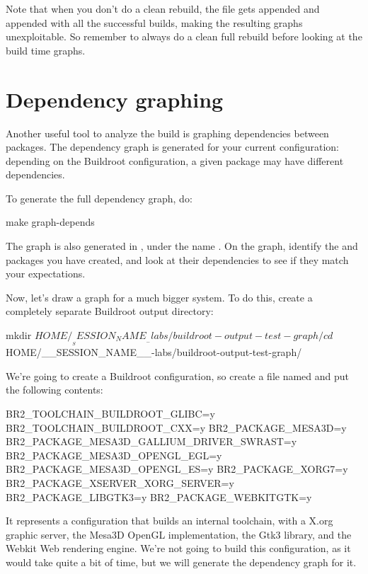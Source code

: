 Note that when you don't do a clean rebuild, the 
file gets appended and appended with all the successful builds, making
the resulting graphs unexploitable. So remember to always do a clean
full rebuild before looking at the build time graphs.

\section{Dependency graphing}

Another useful tool to analyze the build is graphing dependencies
between packages. The dependency graph is generated for your current
configuration: depending on the Buildroot configuration, a given
package may have different dependencies.

To generate the full dependency graph, do:

\begin{bashinput}
make graph-depends
\end{bashinput}

The graph is also generated in , under the name
. On the graph, identify the  and
 packages you have created, and look at their
dependencies to see if they match your expectations.

Now, let's draw a graph for a much bigger system. To do this, create a
completely separate Buildroot output directory:

\begin{bashinput}
mkdir $HOME/__SESSION_NAME__-labs/buildroot-output-test-graph/
cd $HOME/__SESSION_NAME__-labs/buildroot-output-test-graph/
\end{bashinput}

We're going to create a Buildroot configuration, so create a file
named  and put the following contents:

\begin{fileinput}
BR2_TOOLCHAIN_BUILDROOT_GLIBC=y
BR2_TOOLCHAIN_BUILDROOT_CXX=y
BR2_PACKAGE_MESA3D=y
BR2_PACKAGE_MESA3D_GALLIUM_DRIVER_SWRAST=y
BR2_PACKAGE_MESA3D_OPENGL_EGL=y
BR2_PACKAGE_MESA3D_OPENGL_ES=y
BR2_PACKAGE_XORG7=y
BR2_PACKAGE_XSERVER_XORG_SERVER=y
BR2_PACKAGE_LIBGTK3=y
BR2_PACKAGE_WEBKITGTK=y
\end{fileinput}

It represents a configuration that builds an internal toolchain, with
a X.org graphic server, the Mesa3D OpenGL implementation, the Gtk3
library, and the Webkit Web rendering engine. We're not going to build
this configuration, as it would take quite a bit of time, but we will
generate the dependency graph for it.

